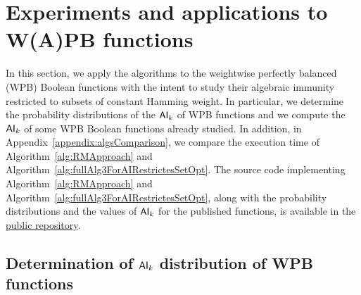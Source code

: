 \documentclass[11pt]{llncs}
\begin{document}


\section{Experiments and applications to W(A)PB functions}
In this section, we apply the algorithms to the weightwise perfectly balanced (WPB) Boolean functions with the intent to study their algebraic immunity restricted to subsets of constant Hamming weight. In particular, we determine the probability distributions of the $\mathsf{AI}_{k}$ of WPB functions and we compute the $\mathsf{AI}_{k}$ of some WPB Boolean functions already studied. In addition, in Appendix~\ref{appendix:algsComparison}, we compare the execution time of Algorithm~\ref{alg:RMApproach} and Algorithm~\ref{alg:fullAlg3ForAIRestrictesSetOpt}.
The source code implementing Algorithm~\ref{alg:RMApproach} and Algorithm~\ref{alg:fullAlg3ForAIRestrictesSetOpt}, along with the probability distributions and the values of $\mathsf{AI}_{k}$ for the published functions, is available in the %
\href{https://github.com/LucaBonamino/restricted_algebraic_immunity}{public repository}.

\FloatBarrier
\subsection{Determination of $\mathsf{AI}_{k}$ distribution of WPB functions}\label{subsec:AIkWPB}
\end{document}
